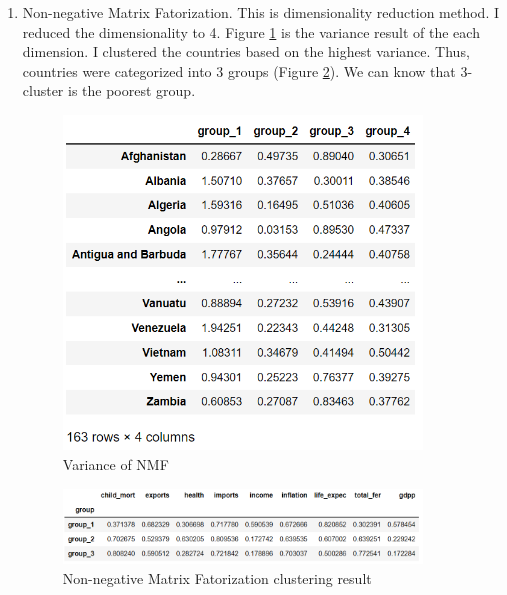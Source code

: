 \documentclass[12pt]{article}
\begin{document}
\begin{itemize}
\begin{enumerate}
      \item Non-negative Matrix Fatorization. This is dimensionality reduction method. I reduced the dimensionality to 4. Figure \ref{variance} is the variance result of the each dimension. I clustered the countries based on the highest variance. Thus, countries were categorized into 3 groups (Figure \ref{nmf}). We can know that 3-cluster is the poorest group.
      \begin{figure}[H]
        \centering
        \includegraphics[width=0.9\textwidth]{figures/variance.png}
        \caption{Variance of NMF}\label{variance}
      \end{figure}

      \begin{figure}[H]
        \centering
        \includegraphics[width=0.9\textwidth]{figures/nmf.png}
        \caption{Non-negative Matrix Fatorization clustering result}\label{nmf}
      \end{figure}


\end{enumerate}
\end{itemize}
\end{document}
